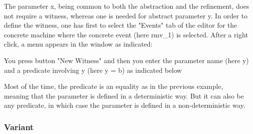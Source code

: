 

The parameter x, being common to both the abstraction and the refinement, does not require a witness, whereas one is needed for abstract parameter y. In order to define the witness, one has first to select the "Events" tab of the editor for the concrete machine where the concrete event (here rmv\_1) is selected. After a right click, a menu appears in the window as indicated:


You press button "New Witness" and then you enter the parameter name (here y) and a predicate involving y (here y = b) as indicated below


Most of the time, the predicate is an equality as in the previous example, meaning that the parameter is defined in a deterministic way. But it can also be any predicate, in which case the parameter is defined in a non-deterministic way. 

\subsubsection{Variant}

